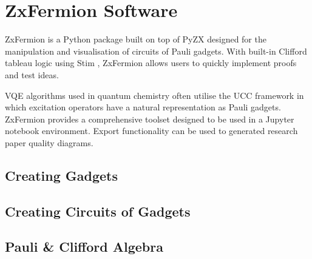 \chapter{ZxFermion Software}

ZxFermion is a Python package built on top of PyZX \cite{Kissinger2020} designed for the manipulation and visualisation of circuits of Pauli gadgets. With built-in Clifford tableau logic using Stim \cite{Gidney2021}, ZxFermion allows users to quickly implement proofs and test ideas.

VQE algorithms used in quantum chemistry often utilise the UCC framework in which excitation operators have a natural representation as Pauli gadgets. ZxFermion provides a comprehensive toolset designed to be used in a Jupyter notebook environment. Export functionality can be used to generated research paper quality diagrams.

\section{Creating Gadgets}
\section{Creating Circuits of Gadgets}
\section{Pauli \& Clifford Algebra}

